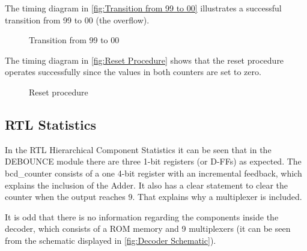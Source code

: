 \documentclass[10pt]{article}
\begin{document}
The timing diagram in \autoref{fig:Transition from 99 to 00} illustrates a successful transition from 99 to 00 (the overflow).

\begin{figure}[ht]
    \centering
    \caption{Transition from 99 to 00}
    \label{fig:Transition from 99 to 00}
\end{figure}


The timing diagram in \autoref{fig:Reset Procedure} shows that the reset procedure operates successfully since the values in both counters are set to zero.
\begin{figure}[ht]
    \centering
    \caption{Reset procedure}
    \label{fig:Reset Procedure}
\end{figure}
\newpage

\subsection{RTL Statistics}

In the RTL Hierarchical Component Statistics it can be seen that in the DEBOUNCE module there are three 1-bit registers (or D-FFs) as expected. The bcd\_counter consists of a one 4-bit register with an incremental feedback, which explains the inclusion of the Adder. It also has a clear statement to clear the counter when the output reaches 9. That explains why a multiplexer is included.

It is odd that there is no information regarding the components inside the decoder, which consists of a ROM memory and 9 multiplexers (it can be seen from the schematic displayed in \autoref{fig:Decoder Schematic}).
\end{document}
